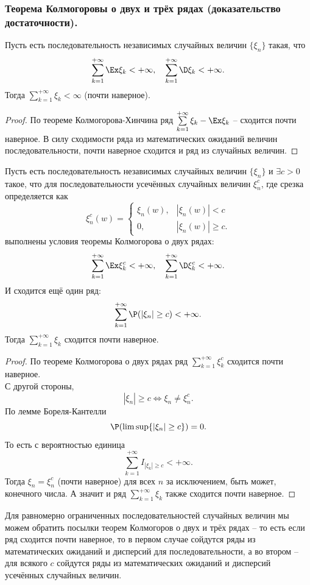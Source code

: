 \subsubsection{Теорема Колмогоровы о двух и трёх рядах (доказательство достаточности).}
\begin{theorem}
    Пусть есть последовательность независимых случайных величин $\{\xi_n\}$ такая, что
    \[
        \sum\limits_{k = 1}^{+\infty} \Ex \xi_k < +\infty, \quad \sum\limits_{k = 1}^{+\infty} \D \xi_k < +\infty.
    \]
    Тогда $\sum\limits_{k = 1}^{+\infty} \xi_k < \infty$ (почти наверное).
\end{theorem}
\begin{proof}
    По теореме Колмогорова-Хинчина ряд $\sum\limits_{k = 1}^{+\infty} \xi_k - \Ex \xi_k$ -- сходится почти наверное.
    В силу сходимости ряда из математических ожиданий величин последовательности, почти наверное сходится и ряд из случайных величин.
\end{proof}
\begin{theorem}
    Пусть есть последовательность независимых случайных величин $\{\xi_n\}$ и $\exists c > 0$ такое, что для последовательности усечённых случайных величин $\xi^c_n$, где срезка определяется как
    \[
        \xi_n^c(w) = \begin{cases}
                      \xi_n(w), & |\xi_n(w)| < c \\
                         0, & |\xi_n(w)| \geq c.
        \end{cases}
    \]
    выполнены условия теоремы Колмогорова о двух рядах:
    \[
        \sum\limits_{k = 1}^{+\infty} \Ex \xi_k^c < +\infty, \quad \sum\limits_{k = 1}^{+\infty} \D \xi_k^c < +\infty.
    \]
    И сходится ещё один ряд:
    \[
        \sum\limits_{k = 1}^{+\infty} \P(|\xi_n| \geq c) < +\infty.
    \]
    Тогда $\sum\limits_{k = 1}^{+\infty} \xi_k$ сходится почти наверное.
\end{theorem}
\begin{proof}
    По теореме Колмогорова о двух рядах ряд $\sum\limits_{k = 1}^{+\infty} \xi_k^c$ сходится почти наверное. \\
    С другой стороны,
    \[
        |\xi_n| \geq c \Longleftrightarrow \xi_n \neq \xi_n^c.
    \]
    По лемме Бореля-Кантелли
    \[
        \P(\limsup \{|\xi_n| \geq c\}) = 0.
    \]
    То есть с вероятностью единица
    \[
        \sum\limits_{k = 1}^{+\infty} I_{|\xi_k| \geq c} < +\infty.
    \]
    Тогда $\xi_n = \xi_n^c$ (почти наверное) для всех $n$ за исключением, быть может, конечного числа.
    А значит и ряд $\sum\limits_{k = 1}^{+\infty} \xi_k$ также сходится почти наверное.
\end{proof}
\begin{note}
    Для равномерно ограниченных последовательностей случайных величин мы можем обратить посылки теорем Колмогоров о двух и трёх рядах -- то есть если ряд сходится почти наверное, то в первом случае сойдутся ряды из математических ожиданий и дисперсий для последовательности, а во втором -- для всякого $c$ сойдутся ряды из математических ожиданий и дисперсий усечённых случайных величин.
\end{note}
